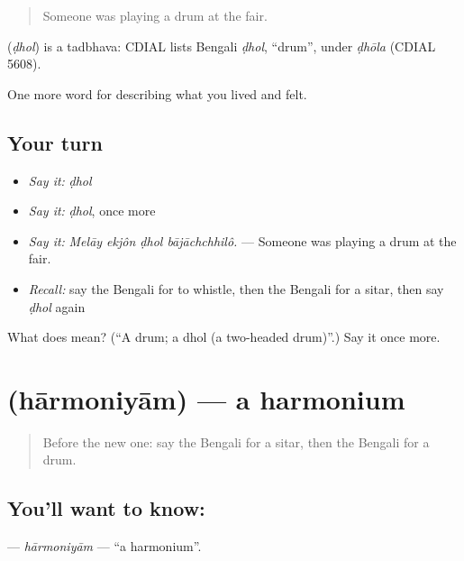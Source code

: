 \begin{quote}
Someone was playing a drum at the fair.
\end{quote}

\begin{cousinweb}
\textbf{} (\emph{ḍhol}) is a tadbhava: CDIAL lists Bengali \emph{ḍhol}, \textquotedblleft{}drum\textquotedblright{}, under \emph{ḍhōla} (CDIAL 5608).
\end{cousinweb}

\begin{grammarlens}[title={What you've built}]
One more word for describing what you lived and felt.
\end{grammarlens}

\subsection*{Your turn}
\begin{itemize}
\raggedright
  \item \emph{Say it:} \emph{ḍhol}
  \item \emph{Say it:} \emph{ḍhol}, once more
  \item \emph{Say it:} \emph{Melāy ekjôn ḍhol bājāchchhilô.} — Someone was playing a drum at the fair.
  \item \emph{Recall:} say the Bengali for to whistle, then the Bengali for a sitar, then say \emph{ḍhol} again
\end{itemize}

\begin{tcolorbox}[breakable,colback=teal!4,colframe=teal!35!black,title={Before you move on}]
What does  mean? (\textquotedblleft{}A drum; a dhol (a two-headed drum)\textquotedblright{}.) Say it once more.
\end{tcolorbox}
\section[\texorpdfstring{\bn{হারমোনিয়াম} (hārmoniyām)}{হারমোনিয়াম (hārmoniyām)}]{ (hārmoniyām) — a harmonium}

\label{lesson:BN-C526-harmoniyam}



\begin{quote}
Before the new one: say the Bengali for a sitar, then the Bengali for a drum.
\end{quote}

\subsection*{You'll want to know: }
\textbf{} — \emph{hārmoniyām} — \textquotedblleft{}a harmonium\textquotedblright{}.

